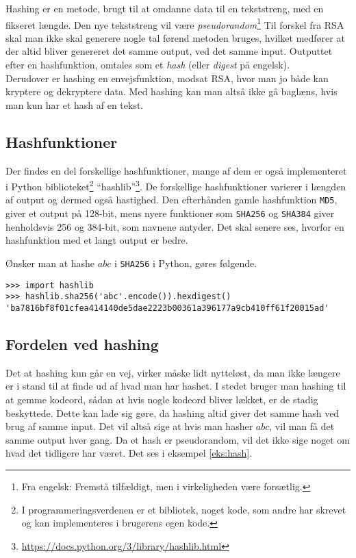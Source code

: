 Hashing er en metode, brugt til at omdanne data til en tekststreng, med en fikseret længde.
Den nye tekststreng vil være \emph{pseudorandom}\footnote{Fra engelsk: Fremstå tilfældigt, men i virkeligheden være forsætlig.} %
Til forskel fra RSA skal man ikke skal generere nogle tal førend metoden bruges, hvilket medfører at der altid bliver genereret det samme output, ved det samme input.
Outputtet efter en hashfunktion, omtales som et \emph{hash} (eller \emph{digest} på engelsk).
\\
Derudover er hashing en envejsfunktion, modsat RSA, hvor man jo både kan kryptere og dekryptere data.
Med hashing kan man altså ikke gå baglæns, hvis man kun har et hash af en tekst.\cite{algoritmer}


\subsection{Hashfunktioner}
Der findes en del forskellige hashfunktioner, mange af dem er også implementeret i Python biblioteket\footnote{I programmeringsverdenen er et bibliotek, noget kode, som andre har skrevet og kan implementeres i brugerens egen kode.} ``hashlib''\footnote{\url{https://docs.python.org/3/library/hashlib.html}}.
De forskellige hashfunktioner varierer i længden af output og dermed også hastighed.
Den efterhånden gamle hashfunktion \texttt{MD5}, giver et output på 128-bit, mens nyere funktioner som \texttt{SHA256} og \texttt{SHA384} giver henholdsvis 256 og 384-bit, som navnene antyder.
Det skal senere ses, hvorfor en hashfunktion med et langt output er bedre.

Ønsker man at hashe \(abc\) i \texttt{SHA256} i Python, gøres følgende.
\begin{verbatim}
>>> import hashlib
>>> hashlib.sha256('abc'.encode()).hexdigest()
'ba7816bf8f01cfea414140de5dae2223b00361a396177a9cb410ff61f20015ad'
\end{verbatim}


\subsection{Fordelen ved hashing}
Det at hashing kun går en vej, virker måske lidt nytteløst, da man ikke længere er i stand til at finde ud af hvad man har hashet.
I stedet bruger man hashing til at gemme kodeord, sådan at hvis nogle kodeord bliver lækket, er de stadig beskyttede.
Dette kan lade sig gøre, da hashing altid giver det samme hash ved brug af samme input.
Det vil altså sige at hvis man hasher \(abc\), vil man få det samme output hver gang.
Da et hash er pseudorandom, vil det ikke sige noget om hvad det tidligere har været.
Det ses i eksempel \ref{eks:hash}.


